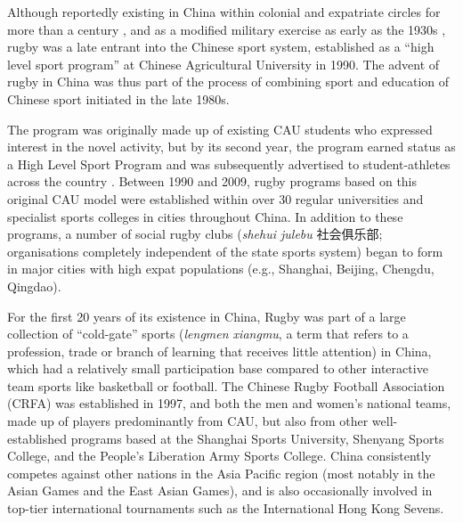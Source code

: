 \begin{CJK}{UTF8}{gbsn}

Although reportedly existing in China within colonial and expatriate circles for more than a century \citep[210]{Reason1979}, and as a modified military exercise as early as the 1930s \citep[135]{Morris2004}, rugby was a late entrant into the Chinese sport system, established as a ``high level sport program'' at  Chinese Agricultural University in 1990.  The advent of rugby in China was thus part of the process of combining sport and education of Chinese sport initiated in the late 1980s.

The program was originally made up of existing CAU students who expressed interest in the novel activity, but by its second year, the program earned status as a High Level Sport Program and was subsequently advertised to student-athletes across the country \citep[2]{Xu2010}.  Between 1990 and 2009, rugby programs based on this original CAU model were established within over 30 regular universities and specialist sports colleges in cities throughout China.  In addition to these programs, a number of social rugby clubs (\textit{shehui julebu} 社会俱乐部; organisations completely independent of the state sports system) began to form in major cities with high expat populations (e.g., Shanghai, Beijing, Chengdu, Qingdao).

For the first 20 years of its existence in China, Rugby was part of a large collection of ``cold-gate'' sports (\textit{lengmen xiangmu}, a term that refers to a profession, trade or branch of learning that receives little attention) in China, which had a relatively small participation base compared to other interactive team sports like basketball or football.  The Chinese Rugby Football Association (CRFA) was established in 1997, and both the men and women’s national teams, made up of players predominantly from CAU, but also from other well-established programs based at the Shanghai Sports University, Shenyang Sports College, and the People’s Liberation Army Sports College. China consistently competes against other nations in the Asia Pacific region (most notably in the Asian Games and the East Asian Games), and is also occasionally involved in top-tier international tournaments such as the International Hong Kong Sevens.


\end{CJK}
